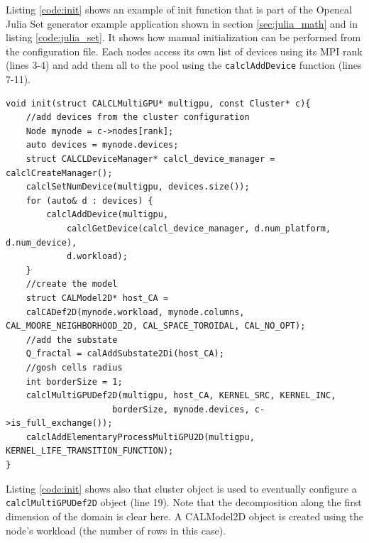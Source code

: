 Listing \ref{code:init} shows an example of init function that is part of the Opencal Julia Set generator example application shown in section \ref{sec:julia_math} and in listing \ref{code:julia_set}. It shows how manual initialization can be performed from the configuration file. Each nodes access its own list of devices using its MPI rank (lines 3-4)  and add them all to the pool using the \texttt{calclAddDevice} function (lines 7-11).
\begin{lstlisting}
void init(struct CALCLMultiGPU* multigpu, const Cluster* c){
	//add devices from the cluster configuration
	Node mynode = c->nodes[rank];
	auto devices = mynode.devices;
	struct CALCLDeviceManager* calcl_device_manager = calclCreateManager();
	calclSetNumDevice(multigpu, devices.size());
	for (auto& d : devices) {
		calclAddDevice(multigpu, 
			calclGetDevice(calcl_device_manager, d.num_platform, d.num_device),
			d.workload);
	}
	//create the model	
	struct CALModel2D* host_CA =
	calCADef2D(mynode.workload, mynode.columns, CAL_MOORE_NEIGHBORHOOD_2D, CAL_SPACE_TOROIDAL, CAL_NO_OPT);
	//add the substate
	Q_fractal = calAddSubstate2Di(host_CA);
	//gosh cells radius
	int borderSize = 1;
	calclMultiGPUDef2D(multigpu, host_CA, KERNEL_SRC, KERNEL_INC,
					 borderSize, mynode.devices, c->is_full_exchange());
	calclAddElementaryProcessMultiGPU2D(multigpu, 	KERNEL_LIFE_TRANSITION_FUNCTION);
}
\end{lstlisting}
Listing \ref{code:init} shows also that cluster object is used to eventually configure a \texttt{calclMultiGPUDef2D} object (line 19). 
Note that the decomposition along the first dimension of the domain is clear here. A CALModel2D object is created using the node's workload (the number of rows in this case).

